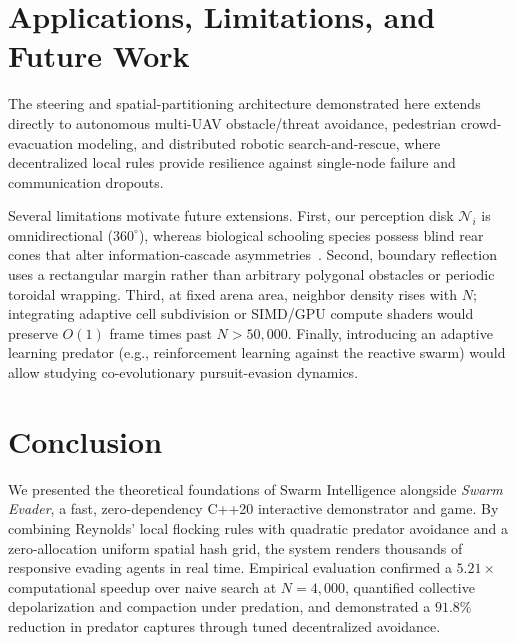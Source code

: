 \documentclass[10pt,twocolumn]{article}
\begin{document}
\section{Applications, Limitations, and Future Work}
The steering and spatial-partitioning architecture demonstrated here extends directly to autonomous multi-UAV obstacle/threat avoidance, pedestrian crowd-evacuation modeling, and distributed robotic search-and-rescue, where decentralized local rules provide resilience against single-node failure and communication dropouts.

Several limitations motivate future extensions. First, our perception disk $\mathcal{N}_i$ is omnidirectional ($360^\circ$), whereas biological schooling species possess blind rear cones that alter information-cascade asymmetries~\cite{couzin2002collective}. Second, boundary reflection uses a rectangular margin rather than arbitrary polygonal obstacles or periodic toroidal wrapping. Third, at fixed arena area, neighbor density rises with $N$; integrating adaptive cell subdivision or SIMD/GPU compute shaders would preserve $O(1)$ frame times past $N > 50{,}000$. Finally, introducing an adaptive learning predator (e.g., reinforcement learning against the reactive swarm) would allow studying co-evolutionary pursuit-evasion dynamics.

\section{Conclusion}
We presented the theoretical foundations of Swarm Intelligence alongside \emph{Swarm Evader}, a fast, zero-dependency C++20 interactive demonstrator and game. By combining Reynolds' local flocking rules with quadratic predator avoidance and a zero-allocation uniform spatial hash grid, the system renders thousands of responsive evading agents in real time. Empirical evaluation confirmed a $5.21\times$ computational speedup over naive search at $N=4{,}000$, quantified collective depolarization and compaction under predation, and demonstrated a $91.8\%$ reduction in predator captures through tuned decentralized avoidance.

{\small


}
\end{document}
